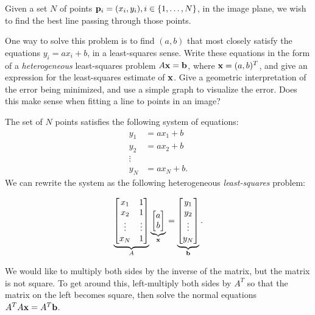 \begin{problem}
  Given a set $N$ of points $\mathbf{p}_i = (x_i, y_i), i \in \left\{1, \ldots, N\right\}$,
  in the image plane, we wish to find the best line passing through those points.

  \begin{enumroman}
    \item One way to solve this problem is to find $(a, b)$ that most closely
      satisfy the equations $y_i = ax_i + b$, in a least-squares sense.
      Write these equations in the form of a \emph{heterogeneous}
      least-squares problem $A \mathbf{x} = \mathbf{b}$, where $\mathbf{x} = (a, b)^T$,
      and give an expression for the least-squares estimate of $\mathbf{x}$.
      Give a geometric interpretation of the error being minimized,
      and use a simple graph to visualize the error.
      Does this make sense when fitting a line to points in an image?
      \begin{answer}
        The set of $N$ points satisfies the following system of equations:
        \begin{align*}
          y_1 &= ax_1 + b \\
          y_2 &= ax_2 + b \\
          \vdots \\
          y_N &= ax_N + b.
        \end{align*}
        We can rewrite the system as the following heterogeneous
        \emph{least-squares} problem:

        \[
          \underbrace{\begin{bmatrix}
            x_1 & 1 \\
            x_2 & 1 \\
            \vdots & \vdots \\
            x_N & 1
          \end{bmatrix}}_{A}
          \underbrace{\begin{bmatrix}
            a \\
            b
          \end{bmatrix}}_{\mathbf{x}}
          =
          \underbrace{\begin{bmatrix}
            y_1 \\
            y_2 \\
            \vdots \\
            y_N
          \end{bmatrix}}_{\mathbf{b}}.
        \]

        We would like to multiply both sides by the inverse of the matrix,
        but the matrix is not square.
        To get around this, left-multiply both sides by $A^T$
        so that the matrix on the left becomes square,
        then solve the normal equations $A^T A \mathbf{x} = A^T \mathbf{b}$.


\end{answer}
\end{enumroman}
\end{problem}
